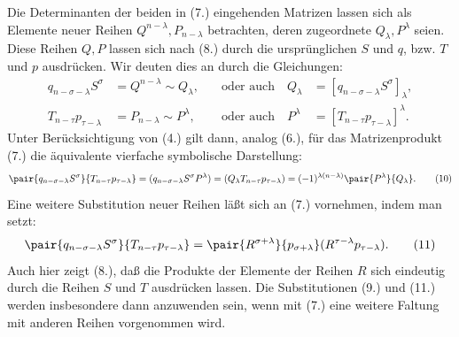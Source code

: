 Die Determinanten der beiden in (7.) eingehenden Matrizen lassen sich als Elemente neuer Reihen $Q^{n-\lambda},P_{n-\lambda}$ betrachten, deren zugeordnete $Q_\lambda,P^\lambda$ seien. Diese Reihen $Q,P$ lassen sich nach (8.) durch die ursprünglichen $S$ und $q$, bzw. $T$ und $p$ ausdrücken. Wir deuten dies an durch die Gleichungen:
\begin{equation}
\begin{aligned}
 q_{n-\sigma-\lambda}S^\sigma&=Q^{n-\lambda}\sim Q_\lambda, &\quad\text{oder auch}\quad Q_\lambda&=[q_{n-\sigma-\lambda}S^\sigma]_\lambda,\\
 T_{n-\tau}p_{\tau-\lambda}&=P_{n-\lambda}\sim P^\lambda, &\quad\text{oder auch}\quad P^\lambda&=[T_{n-\tau}p_{\tau-\lambda}]^\lambda.
\end{aligned}
\tag{9}
\end{equation}
Unter Berücksichtigung von (4.) gilt dann, analog (6.), für das Matrizenprodukt (7.) die äquivalente vierfache symbolische Darstellung:
\begin{equation}
\pair{q_{n-\sigma-\lambda}S^\sigma}{T_{n-\tau}p_{\tau-\lambda}}
=(q_{n-\sigma-\lambda}S^\sigma P^\lambda)=(Q_\lambda T_{n-\tau}p_{\tau-\lambda})=(-1)^{\lambda(n-\lambda)}\pair{P^\lambda}{Q_\lambda}.
\tag{10}
\end{equation}
Eine weitere Substitution neuer Reihen läßt sich an (7.) vornehmen, indem man setzt:
\begin{equation}
 \pair{q_{n-\sigma-\lambda}S^\sigma}{T_{n-\tau}p_{\tau-\lambda}}
 =\pair{R^{\sigma+\lambda}}{p_{\sigma+\lambda}}(R^{\tau-\lambda}p_{\tau-\lambda}).
\tag{11}
\end{equation}
Auch hier zeigt (8.), daß die Produkte der Elemente der Reihen $R$ sich eindeutig durch die Reihen $S$ und $T$ ausdrücken lassen. Die Substitutionen (9.) und (11.) werden insbesondere dann anzuwenden sein, wenn mit (7.) eine weitere Faltung mit anderen Reihen vorgenommen wird.
